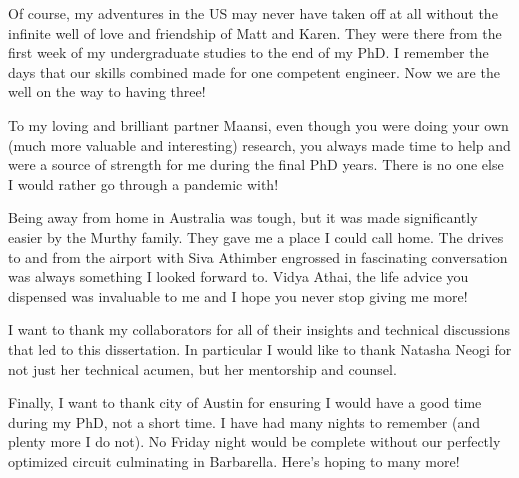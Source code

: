 \documentclass[12pt,twosided,openright]{report}	%
\theoremstyle{definition}
\theoremstyle{remark}
\begin{document}
\begin{acknowledgments}
Of course, my adventures in the US may never have taken off at all without the infinite well of love and friendship of Matt and Karen. They were there from the first week of my undergraduate studies to the end of my PhD. I remember the days that our skills combined made for one competent engineer. Now we are the well on the way to having three!

To my loving and brilliant partner Maansi, even though you were doing your own (much more valuable and interesting) research, you always made time to help and were a source of strength for me during the final PhD years. There is no one else I would rather go through a pandemic with! 

Being away from home in Australia was tough, but it was made significantly easier by the Murthy family. They gave me a place I could call home. The drives to and from the airport with Siva Athimber engrossed in fascinating conversation was always something I looked forward to. Vidya Athai, the life advice you dispensed was invaluable to me and I hope you never stop giving me more! 

I want to thank my collaborators for all of their insights and technical discussions that led to this dissertation. In particular I would like to thank Natasha Neogi for not just her technical acumen, but her mentorship and counsel. 

Finally, I want to thank city of Austin for ensuring I would have a good time during my PhD, not a short time. I have had many nights to remember (and plenty more I do not). No Friday night would be complete without our perfectly optimized circuit culminating in Barbarella. Here's hoping to many more!
 
\end{acknowledgments}


%
\utabstract
{}%
\indent
\end{document}
